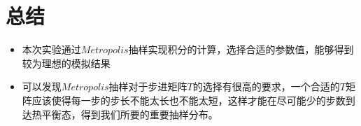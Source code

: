\documentclass[UTF8]{ctexart}
\begin{document}
		

	\section{总结}

	\begin{itemize}
		\item 本次实验通过$Metropolis$抽样实现积分的计算，选择合适的参数值，能够得到较为理想的模拟结果
		\item 可以发现$Metropolis$抽样对于步进矩阵$T$的选择有很高的要求，一个合适的$T$矩阵应该使得每一步的步长不能太长也不能太短，这样才能在尽可能少的步数到达热平衡态，得到我们所要的重要抽样分布。
	\end{itemize}
\end{document}
